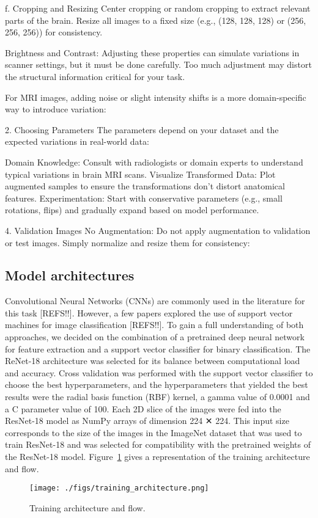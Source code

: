 f. Cropping and Resizing
Center cropping or random cropping to extract relevant parts of the brain.
Resize all images to a fixed size (e.g., (128, 128, 128) or (256, 256, 256)) for consistency.

Brightness and Contrast: Adjusting these properties can simulate variations in scanner settings, but it must be done carefully. Too much adjustment may distort the structural information critical for your task.

For MRI images, adding noise or slight intensity shifts is a more domain-specific way to introduce variation:


2. Choosing Parameters
The parameters depend on your dataset and the expected variations in real-world data:

Domain Knowledge: Consult with radiologists or domain experts to understand typical variations in brain MRI scans.
Visualize Transformed Data: Plot augmented samples to ensure the transformations don't distort anatomical features.
Experimentation: Start with conservative parameters (e.g., small rotations, flips) and gradually expand based on model performance.

4. Validation Images
No Augmentation: Do not apply augmentation to validation or test images. Simply normalize and resize them for consistency:

%
\subsection{Model architectures}

Convolutional Neural Networks (CNNs) are commonly used in the literature for this task [REFS!!]. However, a few papers explored the use of support vector machines for image classification [REFS!!]. To gain a full understanding of both approaches, we decided on the combination of a pretrained deep neural network for feature extraction and a support vector classifier for binary classification. The ReNet-18 architecture was selected for its balance between computational load and accuracy. Cross validation was performed with the support vector classifier to choose the best hyperparameters, and the hyperparameters that yielded the best results were the radial basis function (RBF) kernel, a gamma value of 0.0001 and a C parameter value of 100. Each 2D slice of the images were fed into the ResNet-18 model as NumPy arrays of dimension 224 ✕ 224. This input size corresponds to the size of the images in the ImageNet dataset that was used to train ResNet-18 and was selected for compatibility with the pretrained weights of the ResNet-18 model. Figure~\ref{fig:training_architecture} gives a representation of the training architecture and flow.
%
\begin{figure}
    \centering
    \texttt{[image: ./figs/training\_architecture.png]}
    \caption{Training architecture and flow.}\label{fig:training_architecture}
\end{figure}

